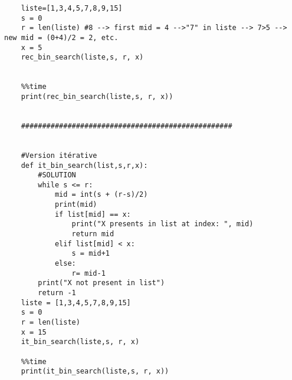 \begin{Exercice}[15 minutes]
\begin{verbatim}
    liste=[1,3,4,5,7,8,9,15]
    s = 0
    r = len(liste) #8 --> first mid = 4 -->"7" in liste --> 7>5 --> new mid = (0+4)/2 = 2, etc.
    x = 5
    rec_bin_search(liste,s, r, x)
    
    
    %%time
    print(rec_bin_search(liste,s, r, x))
    
    
    ##################################################
    
    
    #Version itérative
    def it_bin_search(list,s,r,x):
        #SOLUTION
        while s <= r: 
            mid = int(s + (r-s)/2) 
            print(mid)
            if list[mid] == x:
                print("X presents in list at index: ", mid)
                return mid
            elif list[mid] < x: 
                s = mid+1
            else:
                r= mid-1
        print("X not present in list")
        return -1
    liste = [1,3,4,5,7,8,9,15]
    s = 0
    r = len(liste)
    x = 15
    it_bin_search(liste,s, r, x)
    
    %%time
    print(it_bin_search(liste,s, r, x))
    \end{verbatim}
\end{Exercice}


